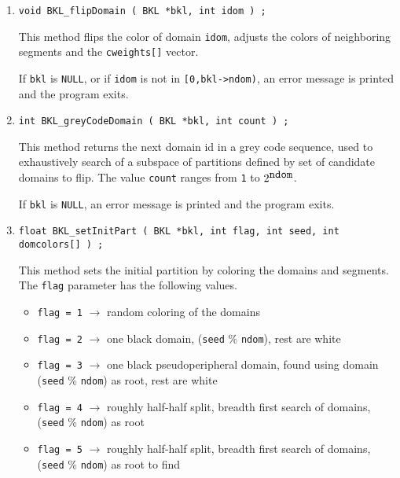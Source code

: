 \begin{enumerate}
\item
\begin{verbatim}
void BKL_flipDomain ( BKL *bkl, int idom ) ;
\end{verbatim}
This method flips the color of domain {\tt idom}, 
adjusts the colors of neighboring segments 
and the {\tt cweights[]} vector.
\par {}
If {\tt bkl} is {\tt NULL},
or if {\tt idom} is not in {\tt [0,bkl->ndom)},
an error message is printed and the program exits.
\item
\begin{verbatim}
int BKL_greyCodeDomain ( BKL *bkl, int count ) ;
\end{verbatim}
This method returns the next domain id in a grey code sequence,
used to exhaustively search of a subspace of partitions
defined by set of candidate domains to flip.
The value {\tt count} ranges from {\tt 1} to $2^{\mbox{\tt ndom}}$.
\par {}
If {\tt bkl} is {\tt NULL},
an error message is printed and the program exits.
\item
\begin{verbatim}
float BKL_setInitPart ( BKL *bkl, int flag, int seed, int domcolors[] ) ;
\end{verbatim}
This method sets the initial partition 
by coloring the domains and segments.
The {\tt flag} parameter has the following values.
\begin{itemize}
\item 
{\tt flag = 1} $\longrightarrow$ 
random coloring of the domains
\item 
{\tt flag = 2} $\longrightarrow$ 
one black domain, ({\tt seed} \% {\tt ndom}), rest are white
\item 
{\tt flag = 3} $\longrightarrow$ 
one black pseudoperipheral domain, found using
domain ({\tt seed} \% {\tt ndom}) as root, rest are white
\item 
{\tt flag = 4} $\longrightarrow$ 
roughly half-half split, breadth first search
of domains, ({\tt seed} \% {\tt ndom}) as root
\item 
{\tt flag = 5} $\longrightarrow$ 
roughly half-half split, breadth first search
of domains, ({\tt seed} \% {\tt ndom}) as root to find

\end{itemize}
\end{enumerate}
